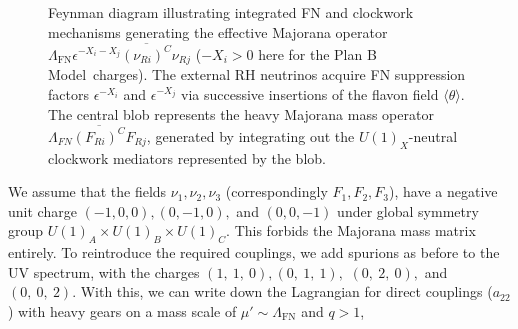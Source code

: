 \documentclass[11pt,letterpaper]{article}
\newcommand{\model}{Plan B Model}
\begin{document}
\begin{figure}[t]
    \caption{Feynman diagram illustrating integrated FN and clockwork mechanisms generating the effective Majorana operator $\Lambda_{\text{FN}} \epsilon^{-X_i-X_j} \overline{(\nu_{Ri})^C} \nu_{Rj}$ ($-X_i>0$ here for the \model\ charges). The external RH neutrinos acquire FN suppression factors $\epsilon^{-X_{i}}$ and $\epsilon^{-X_j}$ via successive insertions of the flavon field $\langle\theta\rangle$. The central blob represents the heavy Majorana mass operator $\Lambda_{FN}\overline{(F_{Ri})^C}F_{Rj}$, generated by integrating out the $U(1)_X$-neutral clockwork mediators represented by the blob.}
    \label{fig:IntCWinFN}
\end{figure}
We assume that the fields $\nu_1, \nu_2,\nu_3$ (correspondingly
$F_1,F_2,F_3$), have a negative unit charge $(-1,0,0), (0,-1,0),$ and $(0,0,-1)$ under global symmetry group $U(1)_A \times U(1)_B \times U(1)_C$. This forbids the Majorana mass matrix
entirely. To reintroduce the required couplings, we add spurions as before to
the UV spectrum, with the charges $(1,\ 1,\ 0), (0,\ 1,\ 1),$ $(0,\ 2,\ 0),$ and $(0,\ 0,\ 2)$. 
With this, we can write down the Lagrangian for direct couplings ($a_{22}$) with heavy gears on a mass scale of $\mu' \sim \Lambda_{\text{FN}}$ and $q>1$,
\end{document}
